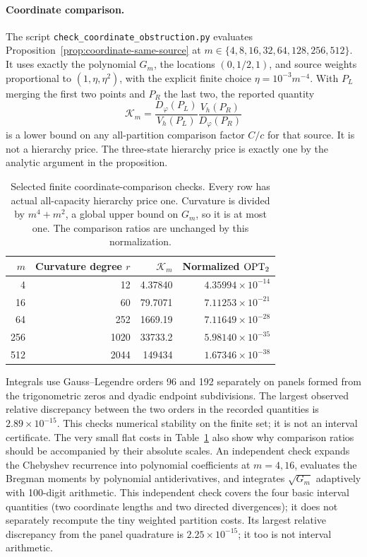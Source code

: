 \paragraph{Coordinate comparison.}
The script \texttt{check\_coordinate\_obstruction.py} evaluates
Proposition~\ref{prop:coordinate-same-source} at
$m\in\{4,8,16,32,64,128,256,512\}$. It uses exactly the polynomial
$G_m$, the locations $(0,1/2,1)$, and source weights proportional to
$(1,\eta,\eta^2)$, with the explicit finite choice
$\eta=10^{-3}m^{-4}$. With $P_L$ merging the first two points and $P_R$
the last two, the reported quantity
\[
 \mathcal K_m=\frac{D_\varphi(P_L)}{V_h(P_L)}
              \frac{V_h(P_R)}{D_\varphi(P_R)}
\]
is a lower bound on any all-partition comparison factor $C/c$ for that
source. It is not a hierarchy price. The three-state hierarchy price is
exactly one by the analytic argument in the proposition.

\begin{table}[ht]
\centering\small
\begin{tabular}{@{}rrrr@{}}
\toprule
$m$ & Curvature degree $r$ & $\mathcal K_m$ & Normalized $\operatorname{OPT}_2$\\
\midrule
4   & 12   & 4.37840 & $4.35994\times10^{-14}$\\
16  & 60   & 79.7071 & $7.11253\times10^{-21}$\\
64  & 252  & 1669.19 & $7.11649\times10^{-28}$\\
256 & 1020 & 33733.2 & $5.98140\times10^{-35}$\\
512 & 2044 & 149434  & $1.67346\times10^{-38}$\\
\bottomrule
\end{tabular}
\caption{Selected finite coordinate-comparison checks. Every row has
actual all-capacity hierarchy price one. Curvature is divided by
$m^4+m^2$, a global upper bound on $G_m$, so it is at most one.
The comparison ratios are unchanged by this normalization.}
\label{tab:coordinate-check}
\end{table}

Integrals use Gauss--Legendre orders 96 and 192 separately on panels
formed from the trigonometric zeros and dyadic endpoint subdivisions.
The largest observed relative discrepancy between the two orders in
the recorded quantities is $2.89\times10^{-15}$. This checks numerical
stability on the finite set; it is not an interval certificate.
The very small flat costs in Table~\ref{tab:coordinate-check} also show
why comparison ratios should be accompanied by their absolute scales.
An independent check expands the Chebyshev recurrence into polynomial
coefficients at $m=4,16$, evaluates the Bregman moments by polynomial
antiderivatives, and integrates $\sqrt{G_m}$ adaptively with 100-digit
arithmetic. This independent check covers the four basic interval
quantities (two coordinate lengths and two directed divergences); it
does not separately recompute the tiny weighted partition costs.
Its largest relative discrepancy from the panel quadrature
is $2.25\times10^{-15}$; it too is not interval arithmetic.

